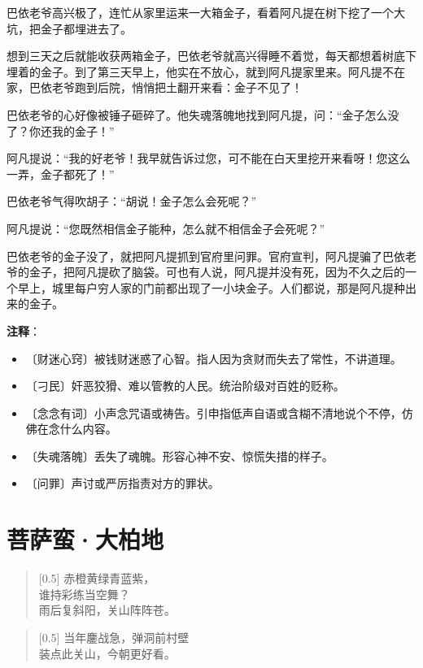 \documentclass[12pt,UTF-8,openany]{ctexbook}
\begin{document}
\begin{large}
    巴依老爷高兴极了，连忙从家里运来一大箱金子，看着阿凡提在树下挖了一个大坑，把金子都埋进去了。
    
    想到三天之后就能收获两箱金子，巴依老爷就高兴得睡不着觉，每天都想着树底下埋着的金子。到了第三天早上，他实在不放心，就到阿凡提家里来。阿凡提不在家，巴依老爷跑到后院，悄悄把土翻开来看：金子不见了！
    
    巴依老爷的心好像被锤子砸碎了。他失魂落魄地找到阿凡提，问：“金子怎么没了？你还我的金子！”
    
    阿凡提说：“我的好老爷！我早就告诉过您，可不能在白天里挖开来看呀！您这么一弄，金子都死了！”
    
    巴依老爷气得吹胡子：“胡说！金子怎么会死呢？”
    
    阿凡提说：“您既然相信金子能种，怎么就不相信金子会死呢？”
    
    巴依老爷的金子没了，就把阿凡提抓到官府里问罪。官府宣判，阿凡提骗了巴依老爷的金子，把阿凡提砍了脑袋。可也有人说，阿凡提并没有死，因为不久之后的一个早上，城里每户穷人家的门前都出现了一小块金子。人们都说，那是阿凡提种出来的金子。
    
\end{large}


\newpage

\textbf{注释}：

\vspace{-1em}

\begin{itemize}
    \setlength\itemsep{-0.2em}
    \item 〔财迷心窍〕被钱财迷惑了心智。指人因为贪财而失去了常性，不讲道理。
    \item 〔刁民〕奸恶狡猾、难以管教的人民。统治阶级对百姓的贬称。
    \item 〔念念有词〕小声念咒语或祷告。引申指低声自语或含糊不清地说个不停，仿佛在念什么内容。
    \item 〔失魂落魄〕丢失了魂魄。形容心神不安、惊慌失措的样子。
    \item 〔问罪〕声讨或严厉指责对方的罪状。
\end{itemize}

\chapter{菩萨蛮·大柏地}

\begin{large}
    
    \begin{verse}[0.5\linewidth]
        赤橙黄绿青蓝紫， \\
        谁持彩练当空舞？ \\
        雨后复斜阳，关山阵阵苍。
    \end{verse}
    
    
    \begin{verse}[0.5\linewidth]
        当年鏖战急，弹洞前村壁 \\
        装点此关山，今朝更好看。
    \end{verse}
    
\end{large}
\end{document}

